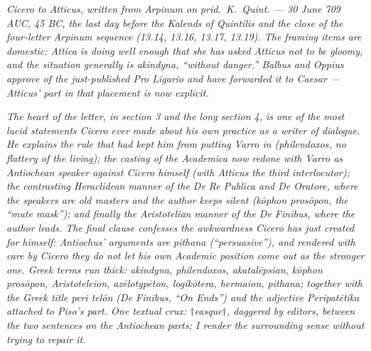 
\textit{Cicero to Atticus, written from Arpinum on
\textit{prid.\ K.\ Quint.} --- 30 June 709 AUC, 45
BC, the last day before the Kalends of Quintilis and
the close of the four-letter Arpinum sequence (13.14,
13.16, 13.17, 13.19). The framing items are
domestic: Attica is doing well enough that she has
asked Atticus not to be gloomy, and the situation
generally is \textit{akindyna}, ``without danger.''
Balbus and Oppius approve of the just-published
\textit{Pro Ligario} and have forwarded it to Caesar
--- Atticus' part in that placement is now
explicit.}

\textit{The heart of the letter, in section 3 and the long
section 4, is one of the most lucid statements
Cicero ever made about his own practice as a writer
of dialogue. He explains the rule that had kept him
from putting Varro in (\textit{philendoxos}, no
flattery of the living); the casting of the
\textit{Academica} now redone with Varro as
Antiochean speaker against Cicero himself (with
Atticus the third interlocutor); the contrasting
Heraclidean manner of the \textit{De Re Publica} and
\textit{De Oratore}, where the speakers are old
masters and the author keeps silent
(\textit{k\=ophon pros\=opon}, the ``mute mask''); and
finally the Aristotelian manner of the
\textit{De Finibus}, where the author leads. The
final clause confesses the awkwardness Cicero has
just created for himself: Antiochus' arguments are
\textit{pithana} (``persuasive''), and rendered with
care by Cicero they do not let his own Academic
position come out as the stronger one. Greek terms
run thick: \textit{akindyna}, \textit{philendoxos},
\textit{akatal\=epsian}, \textit{k\=ophon pros\=opon},
\textit{Aristoteleion}, \textit{az\=elotyp\=eton},
\textit{logik\=otera}, \textit{hermaion},
\textit{pithana}; together with the Greek title
\textit{peri tel\=on} (\textit{De Finibus}, ``On
Ends'') and the adjective \textit{Peripat\=etika}
attached to Piso's part. One textual crux:
\textit{$\dagger$easque$\dagger$}, daggered by
editors, between the two sentences on the
Antiochean parts; I render the surrounding sense
without trying to repair it.}
